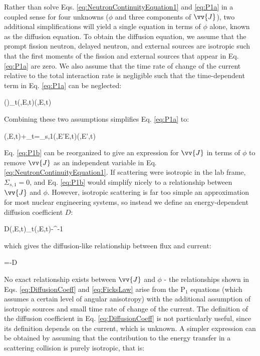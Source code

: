 Rather than solve Eqs. \eqref{eq:NeutronContinuityEquation1} and \eqref{eq:P1a} in a coupled sense for four unknowns (\(\phi\) and three components of \(\vv{J}\)), two additional simplifications will yield a single equation in terms of \(\phi\) alone, known as the diffusion equation. To obtain the diffusion equation, we assume that the prompt fission neutron, delayed neutron, and external sources are isotropic such that the first moments of the fission and external sources that appear in Eq. \eqref{eq:P1a} are zero. We also assume that the time rate of change of the current relative to the total interaction rate is negligible such that the time-dependent term in Eq. \eqref{eq:P1a} can be neglected:

\beq
{}\left(\right)\ll\Sigma_t(,E,t)(,E,t)
\eeq

Combining these two assumptions simplifies Eq. \eqref{eq:P1a} to:

\beq
\label{eq:P1b}
\nabla\phi(,E,t)+\Sigma_t\sset{}\sset=\dEprime \Sigma_{s,1}(,E'\rightarrow E,t)(,E',t)
\eeq

Eq. \eqref{eq:P1b} can be reorganized to give an expression for \(\vv{J}\) in terms of \(\phi\) to remove \(\vv{J}\) as an independent variable in Eq. \eqref{eq:NeutronContinuityEquation1}. If scattering were isotropic in the lab frame, \(\Sigma_{s,1}=0\), and Eq. \eqref{eq:P1b} would simplify nicely to a relationship between \(\vv{J}\) and \(\phi\). However, isotropic scattering is far too simple an approximation for most nuclear engineering systems, so instead we define an energy-dependent diffusion coefficient \(D\):

\beq
\label{eq:DiffusionCoeff}
D(,E,t)\equiv{}\left\lbrack\Sigma_t(,E,t)-\right\rbrack^{-1}
\eeq

which gives the diffusion-like relationship between flux and current:

\beq
\label{eq:FicksLaw}
=-D\nabla\phi
\eeq

No exact relationship exists between \(\vv{J}\) and \(\phi\) - the relationships shown in Eqs. \eqref{eq:DiffusionCoeff} and \eqref{eq:FicksLaw} arise from the P$_{1}$ equations (which assumes a certain level of angular anisotropy) with the additional assumption of isotropic sources and small time rate of change of the current. The definition of the diffusion coefficient in Eq. \eqref{eq:DiffusionCoeff} is not particularly useful, since its definition depends on the current, which is unknown. A simpler expression can be obtained by assuming that the contribution to the energy transfer in a scattering collision is purely isotropic, that is:

